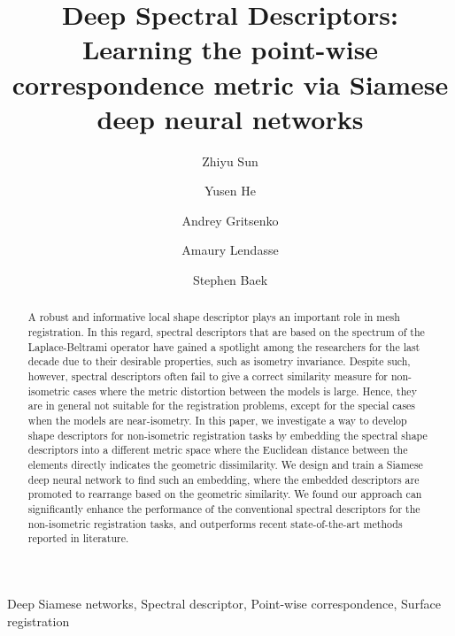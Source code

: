 \documentclass[5p,twocolumn,10pt,times]{elsarticle}
\begin{document}
\baselineskip11pt

\begin{frontmatter}

\title{Deep Spectral Descriptors: Learning the point-wise correspondence metric via Siamese deep neural networks}


\author{Zhiyu Sun}
\author{Yusen He}
\author{Andrey Gritsenko}
\author{Amaury Lendasse}
\author{Stephen Baek}
\address{Department of Mechanical and Industrial Engineering, The University of Iowa, IA, United States}


\begin{abstract} 
A robust and informative local shape descriptor plays an important role in mesh registration. In this regard, spectral descriptors that are based on the spectrum of the Laplace-Beltrami operator have gained a spotlight among the researchers for the last decade due to their desirable properties, such as isometry invariance. Despite such, however, spectral descriptors often fail to give a correct similarity measure for non-isometric cases where the metric distortion between the models is large. Hence, they are in general not suitable for the registration problems, except for the special cases when the models are near-isometry. In this paper, we investigate a way to develop shape descriptors for non-isometric registration tasks by embedding the spectral shape descriptors into a different metric space where the Euclidean distance between the elements directly indicates the geometric dissimilarity. We design and train a Siamese deep neural network to find such an embedding, where the embedded descriptors are promoted to rearrange based on the geometric similarity. We found our approach can significantly enhance the performance of the conventional spectral descriptors for the non-isometric registration tasks, and outperforms recent state-of-the-art methods reported in literature.
\end{abstract}

\begin{keyword} Deep Siamese networks, Spectral descriptor, Point-wise correspondence, Surface registration
\end{keyword}

\end{frontmatter}

\end{document}
